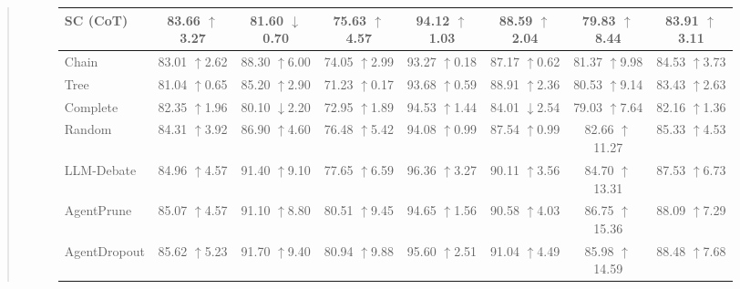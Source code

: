 \documentclass[11pt]{article}
\begin{document}
\begin{abstract}
\begin{figure}[ht!]
\begin{table}[t]
{\begin{tabular}{l|cccccc|c}
SC (CoT)               &
83.66 \scriptsize$\uparrow$3.27 &
81.60 \scriptsize$\downarrow$0.70 &
75.63 \scriptsize$\uparrow$4.57 &
94.12 \scriptsize$\uparrow$1.03 &
88.59 \scriptsize$\uparrow$2.04 &
79.83 \scriptsize$\uparrow$8.44 &
83.91 \scriptsize$\uparrow$3.11          \\
 \midrule
 Chain                              &83.01 \scriptsize$\uparrow$2.62 &
88.30 \scriptsize$\uparrow$6.00 &
74.05 \scriptsize$\uparrow$2.99 &
93.27 \scriptsize$\uparrow$0.18 &
87.17 \scriptsize$\uparrow$0.62 &
81.37 \scriptsize$\uparrow$9.98 &
84.53 \scriptsize$\uparrow$3.73          \\
Tree              &
81.04 \scriptsize$\uparrow$0.65 &
85.20 \scriptsize$\uparrow$2.90 &
71.23 \scriptsize$\uparrow$0.17 &
93.68 \scriptsize$\uparrow$0.59 &
88.91 \scriptsize$\uparrow$2.36 &
80.53 \scriptsize$\uparrow$9.14 &
83.43 \scriptsize$\uparrow$2.63        \\
Complete                           &
82.35 \scriptsize$\uparrow$1.96 &
80.10 \scriptsize$\downarrow$2.20 &
72.95 \scriptsize$\uparrow$1.89 &
94.53 \scriptsize$\uparrow$1.44 &
84.01 \scriptsize$\downarrow$2.54 &
79.03 \scriptsize$\uparrow$7.64 &
82.16 \scriptsize$\uparrow$1.36         \\
Random               &
84.31 \scriptsize$\uparrow$3.92 &
86.90 \scriptsize$\uparrow$4.60 &
76.48 \scriptsize$\uparrow$5.42 &
94.08 \scriptsize$\uparrow$0.99 &
87.54 \scriptsize$\uparrow$0.99 &
82.66 \scriptsize$\uparrow$11.27 &
85.33 \scriptsize$\uparrow$4.53        \\
LLM-Debate                           &
84.96 \scriptsize$\uparrow$4.57 &
91.40 \scriptsize$\uparrow$9.10 &
77.65 \scriptsize$\uparrow$6.59 &
96.36 \scriptsize$\uparrow$3.27 &
90.11 \scriptsize$\uparrow$3.56 &
84.70 \scriptsize$\uparrow$13.31 &
87.53 \scriptsize$\uparrow$6.73       \\
 \midrule
AgentPrune                 & 85.07 \scriptsize$\uparrow$4.57      & 91.10 \scriptsize$\uparrow$8.80          & 80.51 \scriptsize$\uparrow$9.45       & 94.65 \scriptsize$\uparrow$1.56               & 90.58 \scriptsize$\uparrow$4.03          & 86.75 \scriptsize$\uparrow$15.36              & 88.09 \scriptsize$\uparrow$7.29         \\
AgentDropout              & 85.62 \scriptsize$\uparrow$5.23        & 91.70 \scriptsize$\uparrow$9.40          & 80.94 \scriptsize$\uparrow$9.88        & 95.60 \scriptsize$\uparrow$2.51               & 91.04 \scriptsize$\uparrow$4.49         & 85.98 \scriptsize$\uparrow$14.59              & 88.48 \scriptsize$\uparrow$7.68         \\

\end{tabular}}
\end{table}
\end{figure}
\end{abstract}
\end{document}
